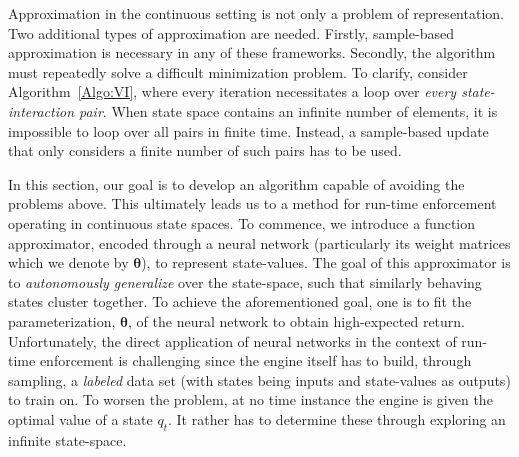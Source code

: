 Approximation in the continuous setting is not only a problem of representation. Two additional types of approximation are needed. Firstly, sample-based approximation is necessary in any of these frameworks. Secondly, the algorithm must repeatedly solve a difficult minimization problem. To clarify, consider Algorithm~\ref{Algo:VI}, where every iteration necessitates a loop over \emph{every state-interaction pair}. When state space contains an infinite number of elements, it is impossible to loop over all pairs in finite time. Instead, a sample-based update that only considers a finite number of such pairs has to be used. %

In this section, our goal is to develop an algorithm capable of avoiding the problems above. This ultimately leads us to a method for run-time enforcement operating in continuous state spaces. 
To commence, we introduce a function approximator, encoded through a neural network (particularly its weight matrices which we denote by $\bm{\theta}$), to represent state-values. The goal of this approximator is to \emph{autonomously generalize} over the state-space, such that similarly behaving states cluster together. To achieve the aforementioned goal, one is to fit the parameterization, $\bm{\theta}$, of the neural network to obtain high-expected return.  Unfortunately, the direct application of neural networks in the context of run-time enforcement is challenging since the engine itself has to build, through sampling, a \emph{labeled} data set (with states being inputs and state-values as outputs) to train on. To worsen the problem, at no time instance the engine is given the optimal value of a state $q_{t}$. It rather has to determine these through exploring an infinite state-space. 


